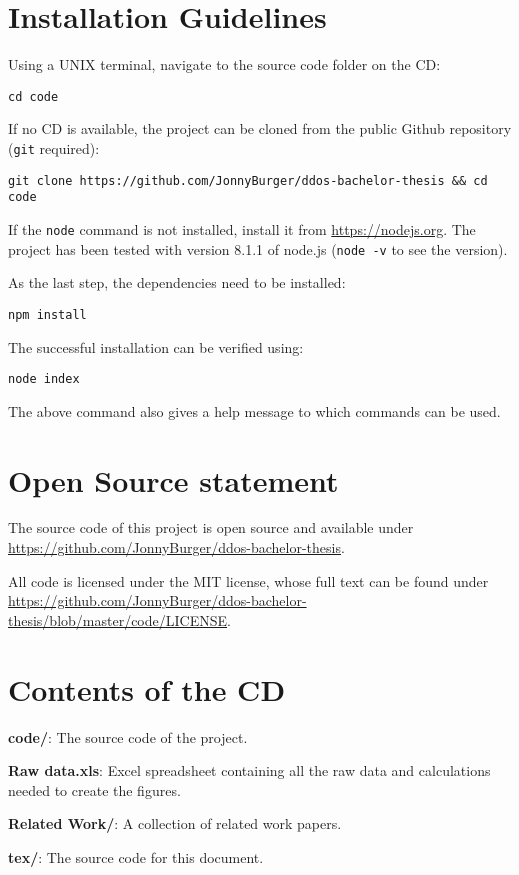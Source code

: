 \appendix

\chapter{Installation Guidelines}

Using a UNIX terminal, navigate to the source code folder on the CD:

\texttt{cd code}

If no CD is available, the project can be cloned from the public Github repository (\texttt{git} required):

\texttt{git clone https://github.com/JonnyBurger/ddos-bachelor-thesis \&\& cd code}

If the  \texttt{node} command is not installed, install it from \url{https://nodejs.org}. The project has been tested with version 8.1.1 of node.js (\texttt{node -v} to see the version).

As the last step, the dependencies need to be installed:

\texttt{npm install}

The successful installation can be verified using:

\texttt{node index}

The above command also gives a help message to which commands can be used.

\chapter{Open Source statement}

The source code of this project is open source and available under \url{https://github.com/JonnyBurger/ddos-bachelor-thesis}.

All code is licensed under the MIT license, whose full text can be found under \url{https://github.com/JonnyBurger/ddos-bachelor-thesis/blob/master/code/LICENSE}.

\chapter{Contents of the CD}

\textbf{code/}: The source code of the project.

\textbf{Raw data.xls}: Excel spreadsheet containing all the raw data and calculations needed to create the figures.

\textbf{Related Work/}: A collection of related work papers.

\textbf{tex/}: The source code for this document.
